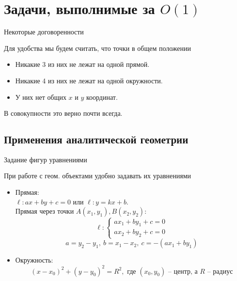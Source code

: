 \section{Задачи, выполнимые за $O(1)$}
\begin{frame}{Некоторые договоренности}

	Для удобства мы будем считать, что точки \alert{в общем положении}

	\begin{itemize}
		\item Никакие 3 из них не лежат на одной прямой.

		\item Никакие 4 из них не лежат на одной окружности.

		\item У них нет общих $x$ и $y$ координат.
	\end{itemize}

	В совокупности это верно почти всегда.\\

\end{frame}

\subsection{Применения аналитической геометрии}

\begin{frame}{Задание фигур уравнениями}

	При работе с геом. объектами удобно задавать их уравнениями

		\begin{itemize}
			\item Прямая:\\

			$\ell\colon ax + by + c = 0$ или $\ell\colon y = kx + b$.\\
			Прямая через точки $A(x_1, y_1), B(x_2, y_2)$:
			\[ \ell\colon \begin{cases} ax_1 + by_1 + c = 0 \\ ax_2 + by_2 + c = 0 \end{cases}\]
			\[ a = y_2 - y_1, \ b = x_1 - x_2, \ c = -(ax_1 + by_1)\]

			\item Окружность:
			\[ (x - x_0)^2 + (y - y_0)^2 = R^2, \text{ где } (x_0, y_0) \text{ -- центр, а } R \text{ -- радиус} \]
		\end{itemize}

\end{frame}


